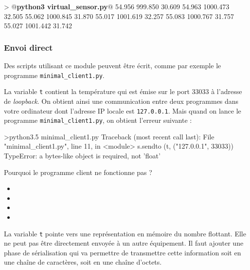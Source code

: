 \begin{termc}[backgroundcolor=\color{palerod}, language=json, basicstyle=\ttfamily\small, escapechar=@]
> @\textbf{python3 virtual\_sensor.py}@
 54.956    999.850  30.609
 54.963   1000.473  32.505
 55.062   1000.845  31.870
 55.017   1001.619  32.257
 55.083   1000.767  31.757
 55.027   1001.442  31.742
 \end{termc} 

\subsubsection{Envoi direct}

Des scripts utilisant ce module peuvent être écrit, comme par exemple le programme \texttt{minimal\_client1.py}.

La variable \texttt{t} contient la température qui est émise sur le port 33033 à l’adresse de \textit{loopback}. On obtient ainsi une communication entre deux programmes dans votre ordinateur dont l'adresse IP locale est \texttt{127.0.0.1}. Mais quand on lance le programme \texttt{minimal\_client1.py}, on obtient l’erreur suivante :

\begin{termc}[backgroundcolor=\color{palerod}, language=json, basicstyle=\ttfamily\small, escapechar=@]
 >python3.5 minimal_client1.py
Traceback (most recent call last):
  File "minimal_client1.py", line 11, in <module>
    s.sendto (t, ("127.0.0.1", 33033))
TypeError: a bytes-like object is required, not 'float'
\end{termc}

{Pourquoi le programme client ne fonctionne pas ?
\begin{itemize}[label=$\circ$]
   \item {}
   \item {}
   \item {}
   \item {}
 \end{itemize}
}
{La variable \texttt{t} pointe vers une représentation en mémoire du nombre flottant. Elle ne peut pas être directement envoyée à un autre équipement. Il faut ajouter une phase de sérialisation qui va permettre de transmettre cette information soit en une chaîne de caractères, soit en une chaîne d'octets.}

